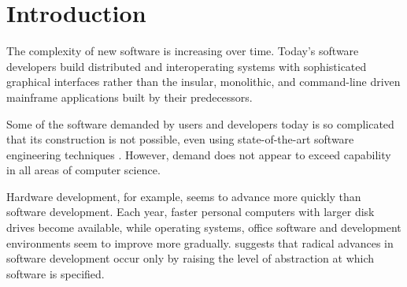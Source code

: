 

\chapter{Introduction}
\label{Introduction}
The complexity of new software is increasing over time. Today's software developers build distributed and interoperating systems with sophisticated graphical interfaces rather than the insular, monolithic, and command-line driven mainframe applications built by their predecessors.

Some of the software demanded by users and developers today is so complicated that its construction is not possible, even using state-of-the-art software engineering techniques \cite{selic03pragmatics}. However, demand does not appear to exceed capability in all areas of computer science.


Hardware development, for example, seems to advance more quickly than software development. Each year, faster personal computers with larger disk drives become available, while operating systems, office software and development environments seem to improve more gradually. \cite{brooks86nosilverbullet} suggests that radical advances in software development occur only by raising the level of abstraction at which software is specified.

